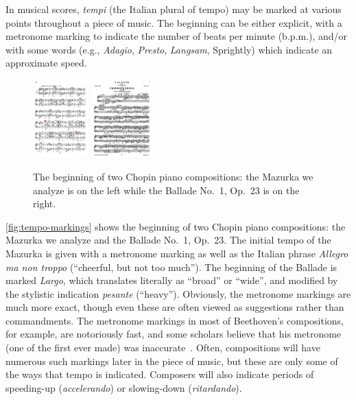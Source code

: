 \documentclass[aoas]{imsart}
\begin{document}
In musical scores, {\em tempi} (the Italian plural of tempo) may be
marked at various points throughout a piece of music. The
beginning can be either explicit, with a metronome marking to
indicate the number of beats per minute (b.p.m.), and/or with some words
(e.g., {\em Adagio}, {\em Presto}, {\em Langsam}, Sprightly) which indicate an
approximate speed. 
\begin{figure}[t!]
  \centering
  \includegraphics[height=3cm]{mazurka-top.pdf}
  \includegraphics[height=3cm]{ballade-top.pdf}
  \caption{The beginning of two Chopin piano compositions: the Mazurka
    we analyze is on the left while the Ballade No.\ 1, Op.\ 23 is on
    the right.}
  \label{fig:tempo-markings}
\end{figure}
\autoref{fig:tempo-markings} shows the beginning of two Chopin piano
compositions: the Mazurka we analyze and the Ballade No.\ 1, Op.\
23. The initial tempo of the Mazurka is given with a metronome
marking as well as the Italian phrase {\em Allegro ma non troppo}
(``cheerful, but not too much''). The beginning of the Ballade is 
marked {\em Largo}, which translates literally as ``broad'' or
``wide'', and modified by the stylistic indication {\em pesante}
(``heavy''). Obviously, the metronome markings are much more exact,
though even these are often viewed as suggestions rather than
commandments. The metronome markings in most of Beethoven's
compositions, for example, are notoriously fast, and some scholars
believe that his metronome (one of the first ever made) was
inaccurate~\citep{ForsenGray2013}. Often, compositions will have numerous such markings later
in the piece of music, but these are only some of the ways that tempo
is indicated. Composers will also indicate periods of speeding-up
(\emph{accelerando}) or
slowing-down (\emph{ritardando}).
\end{document}
